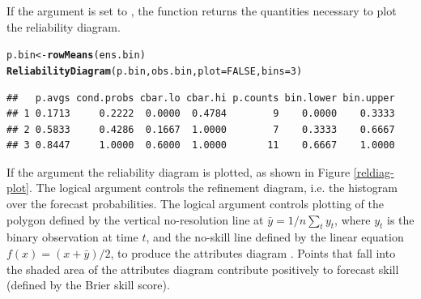 \documentclass[article]{jss}\usepackage{graphicx, color}
\makeatletter
\newcommand{\hlfunctioncall}[1]{\textcolor[rgb]{0,0.501960784313725,0.752941176470588}{\textbf{#1}}}%
\newenvironment{kframe}{%
 \def\at@end@of@kframe{}%
 \ifinner\ifhmode%
  \def\at@end@of@kframe{\end{minipage}}%
  \begin{minipage}{\columnwidth}%
 \fi\fi%
 \def\FrameCommand##1{\hskip\@totalleftmargin \hskip-\fboxsep
 \colorbox{shadecolor}{##1}\hskip-\fboxsep
     \hskip-\linewidth \hskip-\@totalleftmargin \hskip\columnwidth}%
 \MakeFramed {\advance\hsize-\width
   \@totalleftmargin\z@ \linewidth\hsize
   \@setminipage}}%
 {\par\unskip\endMakeFramed%
 \at@end@of@kframe}
\newenvironment{knitrout}{}{} %
\makeatother
\begin{document}
If the  argument is set to , the  function returns the quantities necessary to plot the reliability diagram.

\begin{knitrout}
\color{fgcolor}\begin{kframe}
\begin{alltt}
p.bin <- \hlfunctioncall{rowMeans}(ens.bin)
\hlfunctioncall{ReliabilityDiagram}(p.bin, obs.bin, plot=FALSE, bins=3)
\end{alltt}
\begin{verbatim}
##   p.avgs cond.probs cbar.lo cbar.hi p.counts bin.lower bin.upper
## 1 0.1713     0.2222  0.0000  0.4784        9    0.0000    0.3333
## 2 0.5833     0.4286  0.1667  1.0000        7    0.3333    0.6667
## 3 0.8447     1.0000  0.6000  1.0000       11    0.6667    1.0000
\end{verbatim}
\end{kframe}
\end{knitrout}


If the argument  the reliability diagram is plotted, as shown in Figure \ref{reldiag-plot}. 
The logical argument  controls the refinement diagram, i.e. the histogram over the forecast probabilities.
The logical argument  controls plotting of the polygon defined by the vertical no-resolution line at $\bar{y} = 1/n \sum_t y_t$, where $y_t$ is the binary observation at time $t$, and the no-skill line defined by the linear equation $f(x)=(x+\bar{y})/2$, to produce the attributes diagram \citep{hsu1986attributes}.
Points that fall into the shaded area of the attributes diagram contribute positively to forecast skill (defined by the Brier skill score).
\end{document}
